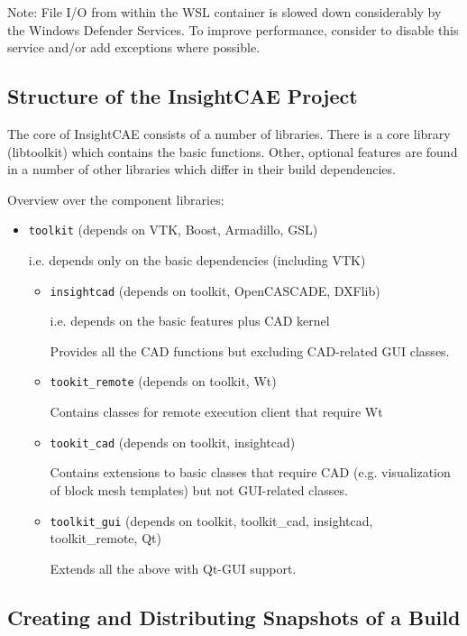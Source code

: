 Note: \warningsymbol File I/O from within the WSL container is slowed down considerably by the Windows Defender Services. To improve performance, consider to disable this service and/or add exceptions where possible.


\subsection{Structure of the InsightCAE Project}

The core of InsightCAE consists of a number of libraries. 
There is a core library (libtoolkit) which contains the basic functions.
Other, optional features are found in a number of other libraries which differ in their build dependencies.

Overview over the component libraries:
\begin{itemize}
\item \texttt{toolkit} (depends on VTK, Boost, Armadillo, GSL)

i.e. depends only on the basic dependencies (including VTK)
\begin{itemize}
\item \texttt{insightcad} (depends on toolkit, OpenCASCADE, DXFlib)

i.e. depends on the basic features plus CAD kernel

Provides all the CAD functions but excluding CAD-related GUI classes.

\item \texttt{tookit\_remote} (depends on toolkit, Wt)

Contains classes for remote execution client that require Wt

\item \texttt{tookit\_cad} (depends on toolkit, insightcad)

Contains extensions to basic classes that require CAD (e.g. visualization of block mesh templates) but not GUI-related classes.

\item \texttt{toolkit\_gui} (depends on toolkit, toolkit\_cad, insightcad, toolkit\_remote, Qt)

Extends all the above with Qt-GUI support.
\end{itemize}
\end{itemize}



\subsection{Creating and Distributing Snapshots of a Build}

